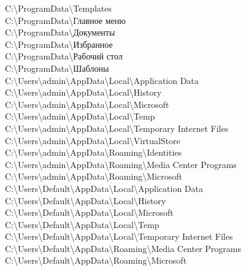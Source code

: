 C:\textbackslash ProgramData\textbackslash Templates \\
C:\textbackslash ProgramData\textbackslash Главное меню \\
C:\textbackslash ProgramData\textbackslash Документы \\
C:\textbackslash ProgramData\textbackslash Избранное \\
C:\textbackslash ProgramData\textbackslash Рабочий стол \\
C:\textbackslash ProgramData\textbackslash Шаблоны \\
C:\textbackslash Users\textbackslash admin\textbackslash AppData\textbackslash Local\textbackslash Application Data \\
C:\textbackslash Users\textbackslash admin\textbackslash AppData\textbackslash Local\textbackslash History \\
C:\textbackslash Users\textbackslash admin\textbackslash AppData\textbackslash Local\textbackslash Microsoft \\
C:\textbackslash Users\textbackslash admin\textbackslash AppData\textbackslash Local\textbackslash Temp \\
C:\textbackslash Users\textbackslash admin\textbackslash AppData\textbackslash Local\textbackslash Temporary Internet Files \\
C:\textbackslash Users\textbackslash admin\textbackslash AppData\textbackslash Local\textbackslash VirtualStore \\
C:\textbackslash Users\textbackslash admin\textbackslash AppData\textbackslash Roaming\textbackslash Identities \\
C:\textbackslash Users\textbackslash admin\textbackslash AppData\textbackslash Roaming\textbackslash Media Center Programs \\
C:\textbackslash Users\textbackslash admin\textbackslash AppData\textbackslash Roaming\textbackslash Microsoft \\
C:\textbackslash Users\textbackslash Default\textbackslash AppData\textbackslash Local\textbackslash Application Data \\
C:\textbackslash Users\textbackslash Default\textbackslash AppData\textbackslash Local\textbackslash History \\
C:\textbackslash Users\textbackslash Default\textbackslash AppData\textbackslash Local\textbackslash Microsoft \\
C:\textbackslash Users\textbackslash Default\textbackslash AppData\textbackslash Local\textbackslash Temp \\
C:\textbackslash Users\textbackslash Default\textbackslash AppData\textbackslash Local\textbackslash Temporary Internet Files \\
C:\textbackslash Users\textbackslash Default\textbackslash AppData\textbackslash Roaming\textbackslash Media Center Programs \\
C:\textbackslash Users\textbackslash Default\textbackslash AppData\textbackslash Roaming\textbackslash Microsoft \\
